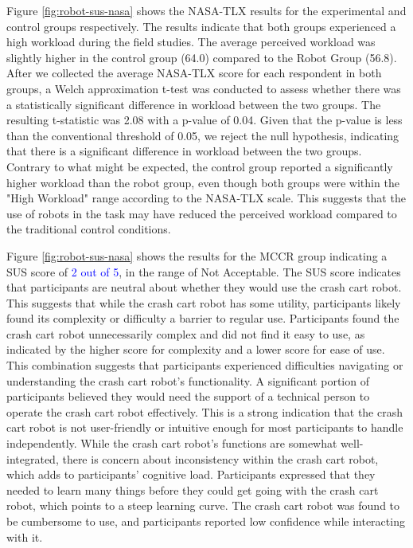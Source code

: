 Figure \ref{fig:robot-sus-nasa} shows the NASA-TLX results for the experimental and control groups respectively. 
The results indicate that both groups experienced a high workload during the field studies. 
The average perceived workload was slightly higher in the control group (64.0) compared to the Robot Group (56.8). 
After we collected the average NASA-TLX score for each respondent in both groups, a Welch approximation t-test was conducted to assess whether there was a statistically significant difference in workload between the two groups. 
The resulting t-statistic was 2.08 with a p-value of 0.04. 
Given that the p-value is less than the conventional threshold of 0.05, we reject the null hypothesis, indicating that there is a significant difference in workload between the two groups. 
Contrary to what might be expected, the control group reported a significantly higher workload than the robot group, even though both groups were within the "High Workload" range according to the NASA-TLX scale. 
This suggests that the use of robots in the task may have reduced the perceived workload compared to the traditional control conditions. 

Figure \ref{fig:robot-sus-nasa} shows the results for the MCCR group indicating a SUS score of \textcolor{blue}{2 out of 5}, in the range of Not Acceptable.
The SUS score indicates that participants are neutral about whether they would use the crash cart robot. 
This suggests that while the crash cart robot has some utility, participants likely found its complexity or difficulty a barrier to regular use.
Participants found the crash cart robot unnecessarily complex and did not find it easy to use, as indicated by the higher score for complexity and a lower score for ease of use. 
This combination suggests that participants experienced difficulties navigating or understanding the crash cart robot’s functionality.
A significant portion of participants believed they would need the support of a technical person to operate the crash cart robot effectively. This is a strong indication that the crash cart robot is not user-friendly or intuitive enough for most participants to handle independently.
While the crash cart robot’s functions are somewhat well-integrated, there is concern about inconsistency within the crash cart robot, which adds to participants’ cognitive load.
Participants expressed that they needed to learn many things before they could get going with the crash cart robot, which points to a steep learning curve. 
The crash cart robot was found to be cumbersome to use, and participants reported low confidence while interacting with it.


